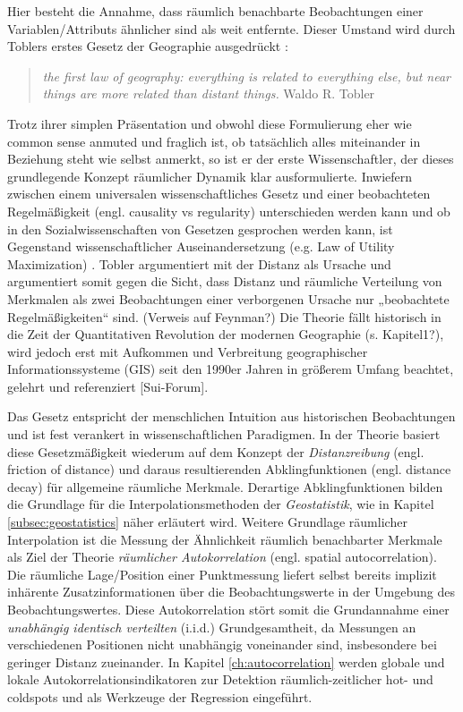Hier besteht die Annahme, dass räumlich benachbarte Beobachtungen einer Variablen/Attributs ähnlicher 
sind als weit entfernte. Dieser Umstand wird durch Toblers erstes Gesetz der Geographie 
ausgedrückt \cite[S.234]{tobler_computer_1970}:
\begin{quotation}
    \glqq […] \textit{the first law of geography: everything is related to everything else, 
    but near things are more related than distant things.}\grqq{} Waldo R. Tobler
\end{quotation}
Trotz ihrer simplen Präsentation und obwohl diese Formulierung eher wie 
common sense anmuted und fraglich ist, ob tatsächlich 
\glqq alles miteinander in Beziehung steht\grqq{} wie \cite{tobler_first_2004} selbst anmerkt, 
so ist er der erste Wissenschaftler, der dieses grundlegende Konzept 
räumlicher Dynamik klar ausformulierte. \newline
Inwiefern zwischen einem universalen wissenschaftliches Gesetz und einer beobachteten 
Regelmäßigkeit (engl. causality vs regularity) unterschieden werden kann und ob in 
den Sozialwissenschaften von Gesetzen gesprochen werden kann, ist Gegenstand 
wissenschaftlicher Auseinandersetzung (e.g. Law of Utility Maximization) \cite{goodchild_validity_2004}. 
Tobler argumentiert mit der Distanz als Ursache und argumentiert somit gegen die Sicht, 
dass Distanz und räumliche Verteilung von Merkmalen als zwei Beobachtungen einer 
verborgenen Ursache nur „beobachtete Regelmäßigkeiten“ sind. (Verweis auf Feynman?) \cite{sui_toblers_2004} 
Die Theorie fällt historisch in die Zeit der Quantitativen Revolution der 
modernen Geographie (s. Kapitel1?), wird jedoch erst mit Aufkommen und Verbreitung 
geographischer Informationssysteme (GIS) seit den 1990er Jahren in größerem Umfang 
beachtet, gelehrt und referenziert [Sui-Forum].

Das Gesetz entspricht der menschlichen Intuition aus historischen 
Beobachtungen und ist fest verankert in wissenschaftlichen Paradigmen. 
In der Theorie basiert diese Gesetzmäßigkeit wiederum auf dem Konzept 
der \emph{Distanzreibung} (engl. friction of distance) 
und daraus resultierenden Abklingfunktionen (engl. distance decay) für allgemeine räumliche Merkmale. 
Derartige Abklingfunktionen bilden die Grundlage für die Interpolationsmethoden der \emph{Geostatistik}, 
wie in Kapitel \ref{subsec:geostatistics} näher erläutert wird.
Weitere Grundlage räumlicher Interpolation ist die Messung der Ähnlichkeit räumlich benachbarter Merkmale 
als Ziel der Theorie \emph{räumlicher Autokorrelation} (engl. spatial autocorrelation). 
Die räumliche Lage/Position einer Punktmessung liefert selbst bereits implizit inhärente Zusatzinformationen 
über die Beobachtungswerte in der Umgebung des Beobachtungswertes. 
Diese Autokorrelation stört somit die Grundannahme einer \emph{unabhängig identisch verteilten} (i.i.d.) Grundgesamtheit, 
da Messungen an verschiedenen Positionen nicht unabhängig voneinander sind, insbesondere bei geringer Distanz zueinander. 
In Kapitel \ref{ch:autocorrelation} werden globale und lokale Autokorrelationsindikatoren zur 
Detektion räumlich-zeitlicher hot- und coldspots und als Werkzeuge der Regression eingeführt.

